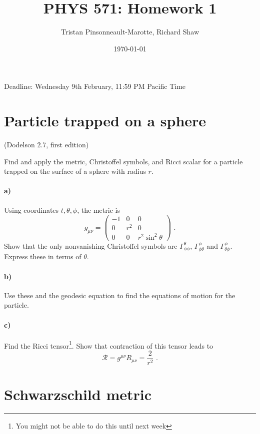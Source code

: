 \documentclass[12pt]{article}
\author{Tristan Pinsonneault-Marotte, Richard Shaw}
\title{PHYS 571: Homework 1}
\date{\today}
\begin{document}
\maketitle

Deadline: Wednesday 9th February, 11:59 PM Pacific Time

\section{Particle trapped on a sphere}
(Dodelson 2.7, first edition)

Find and apply the metric, Christoffel symbols, and Ricci scalar for a particle
trapped on the surface of a sphere with radius $r$.

\paragraph{a)} Using coordinates $t, \theta, \phi$, the metric is
\begin{equation}
    g_{\mu\nu} = \begin{pmatrix}
        -1 & 0 & 0 \\
        0 & r^2 & 0 \\
        0 & 0 & r^2 \sin^2\theta
    \end{pmatrix}
    \text{ .}
\end{equation}
Show that the only nonvanishing Christoffel symbols are
$\Gamma^\theta_{\phi\phi}$, $\Gamma^\phi_{\phi\theta}$ and
$\Gamma^\phi_{\theta\phi}$. Express these in terms of $\theta$.

\paragraph{b)} Use these and the geodesic equation to find the equations of
motion for the particle.

\paragraph{c)} Find the Ricci tensor\footnote{You might not be able to do this until next week}. Show that contraction of this tensor leads
to
\begin{equation}
    \mathcal{R} = g^{\mu\nu} R_{\mu\nu} = \frac{2}{r^2} \text{ .}
\end{equation}

\section{Schwarzschild metric}
\end{document}
